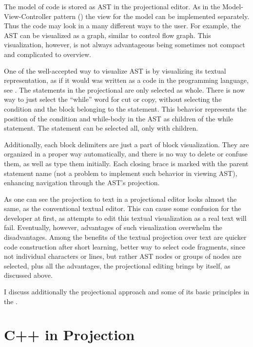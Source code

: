 The model of code is stored as AST in the projectional editor. As in the Model-View-Controller pattern (\cite{GOF95}) the view for
the model can be implemented separately. Thus the code may look in a many different ways to the user. For example, the AST can be
visualized as a graph, similar to control flow graph. This visualization, however, is not always advantageous being sometimes not compact and
complicated to overview.


One of the well-accepted way to visualize AST is by visualizing its textual representation, as if it would was written 
as a code in the programming language, see . The statements in the projectional are only selected as whole.
There is now way to just select the ``while'' word for cut or copy, without selecting the condition and the block belonging
to the statement. This behavior represents the position of the condition and while-body in the AST as children of the while
statement. The statement can be selected all, only with children.

Additionally, each block delimiters are just a part of block visualization. They are organized in a proper way automatically,
and there is no way to delete or confuse them, as well as type them initially. Each closing brace is marked with the 
parent statement name (not a problem to implement such behavior in viewing AST), enhancing navigation through the AST's projection.

As one can see the projection to text in a projectional editor looks almost the same, as the conventional textual editor.
This can cause some confusion for the developer at first, as attempts to edit this textual visualization as a real text
will fail. Eventually, however, advantages of such visualization overwhelm the disadvantages. Among the benefits of the 
textual projection over text are quicker code construction after short learning, better way to select code fragments,
since not individual characters or lines, but rather AST nodes or groups of nodes are selected, plus all the advantages,
the projectional editing brings by itself, as discussed above.

I discuss additionally the projectional approach and some of its basic principles in the .

\section{C++ in Projection}

